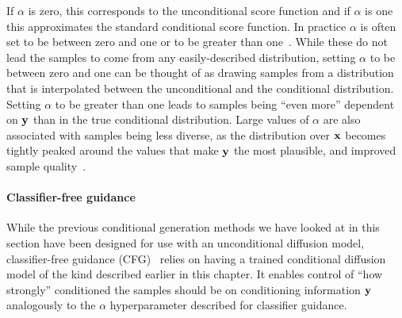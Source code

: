 If $\alpha$ is zero, this corresponds to the unconditional score function and if $\alpha$ is one this approximates the standard conditional score function. In practice $\alpha$ is often set to be between zero and one or to be greater than one~\citep{ho2022classifier,meng2022distillation}. While these do not lead the samples to come from any easily-described distribution, setting $\alpha$ to be between zero and one can be thought of as drawing samples from a distribution that is interpolated between the unconditional and the conditional distribution. Setting $\alpha$ to be greater than one leads to samples being ``even more'' dependent on ${\mathbf{y}}$ than in the true conditional distribution. Large values of $\alpha$ are also associated with samples being less diverse, as the distribution over ${\mathbf{x}}$ becomes tightly peaked around the values that make ${\mathbf{y}}$ the most plausible, and improved sample quality~\citep{ho2022classifier}.

\paragraph{Classifier-free guidance}
While the previous conditional generation methods we have looked at in this section have been designed for use with an unconditional diffusion model, classifier-free guidance (CFG)~\citep{ho2022classifier} relies on having a trained conditional diffusion model of the kind described earlier in this chapter. It enables control of ``how strongly'' conditioned the samples should be on conditioning information ${\mathbf{y}}$ analogously to the $\alpha$ hyperparameter described for classifier guidance.

